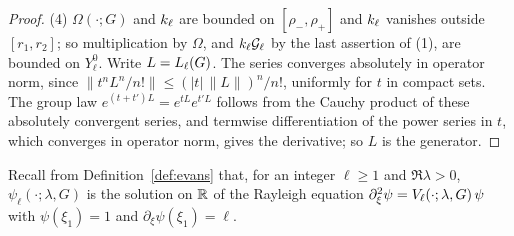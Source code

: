 \begin{proof}
(4) $\Omega(\cdot;G)$ and $k_\ell$ are bounded on $[\rho_-,\rho_+]$ and
$k_\ell$ vanishes outside $[r_1,r_2]$; so multiplication by $\Omega$, and
$k_\ell\mathcal{G}_\ell$ by the last assertion of (1), are bounded on $Y^0_\ell$.
Write $L=L_{\ell}(G)$. The series converges absolutely in operator norm, since
$\|t^nL^n/n!\|\le(|t|\,\|L\|)^n/n!$, uniformly for $t$ in compact sets. The group law
$e^{(t+t')L}=e^{tL}e^{t'L}$ follows from the Cauchy product of these absolutely
convergent series, and termwise differentiation of the power series in $t$, which
converges in operator norm, gives the derivative; so $L$ is the generator.
\end{proof}

Recall from Definition~\ref{def:evans} that, for an integer $\ell\ge1$ and
$\Re\lambda>0$, $\psi_\ell(\cdot;\lambda,G)$ is the solution on $\mathbb{R}$ of the Rayleigh
equation $\partial_\xi^2\psi=V_\ell(\cdot;\lambda,G)\,\psi$ with $\psi(\xi_1)=1$ and
$\partial_\xi\psi(\xi_1)=\ell$.

